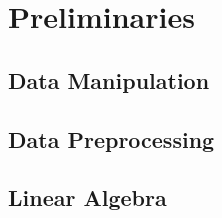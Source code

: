 \documentclass{article}
\begin{document}
\tableofcontents

\newpage
\setcounter{section}{1}
\section{Preliminaries}
\subsection{Data Manipulation}

\subsection{Data Preprocessing}

\subsection{Linear Algebra}
\end{document}
